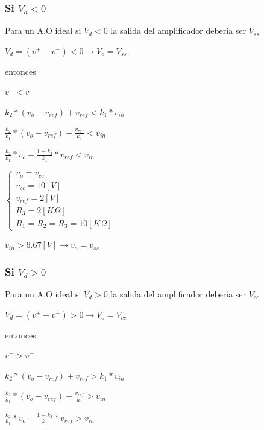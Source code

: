 \documentclass[11pt, a4paper]{article}
\begin{document}
\subsubsection{Si $V_d<0$}
Para un A.O ideal si $V_d<0$ la salida del amplificador debería ser $V_{ss}$
\begin{center}
	
	$V_d = (v^+ - v^-)<0 \rightarrow  V_o = V_{ss}$
\end{center}
entonces
\begin{center}
	$v^+ < v^-$
\end{center}
\begin{center}
	$k_2 * (v_o - v_{ref})+ v_{ref} < k_1 * v_{in}$
\end{center}
\begin{center}
	$\frac{k_2}{k_1} * (v_o- v_{ref}) + \frac{v_{ref}}{k_1} <v_{in}$ 
\end{center}
\begin{center}
	$\frac{k_2}{k_1} * v_o + \frac{1 - k_2}{k_1} * v_{ref} <v_{in}$ 
\end{center}

\begin{center}
	$\left\{\begin{matrix}
	v_o = v_{cc}\\ 
	v_{cc} = 10[V]\\ 
	v_{ref} = 2[V]\\ 
	R_3 = 2[K\Omega]\\ 
	R_1 = R_2 = R_3 = 10[K\Omega]
\end{matrix}\right.$
\end{center}
\begin{center}
	$v_{in} > 6.67[V] \rightarrow v_o = v_{ss}$ 
\end{center}

\subsubsection{Si $V_d>0$}
Para un A.O ideal si $V_d>0$ la salida del amplificador debería ser $V_{cc}$
\begin{center}
	
	$V_d = (v^+ - v^-)>0 \rightarrow  V_o = V_{cc}$
\end{center}
entonces
\begin{center}
	$v^+ > v^-$
\end{center}
\begin{center}
	$k_2 * (v_o - v_{ref})+ v_{ref} > k_1 * v_{in}$
\end{center}
\begin{center}
	$\frac{k_2}{k_1} * (v_o- v_{ref}) + \frac{v_{ref}}{k_1} > v_{in}$ 
\end{center}
\begin{center}
	$\frac{k_2}{k_1} * v_o + \frac{1 - k_2}{k_1} * v_{ref} > v_{in}$ 
\end{center}
\end{document}
